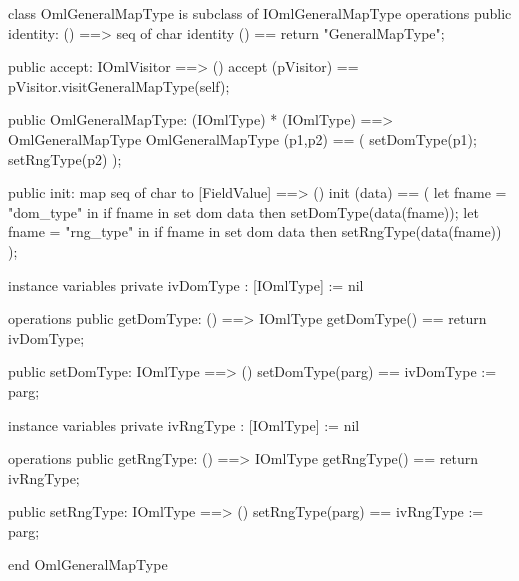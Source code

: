 \begin{vdm_al}
class OmlGeneralMapType is subclass of IOmlGeneralMapType
operations
  public identity: () ==> seq of char
  identity () == return "GeneralMapType";

  public accept: IOmlVisitor ==> ()
  accept (pVisitor) == pVisitor.visitGeneralMapType(self);

  public OmlGeneralMapType:
      (IOmlType) *
      (IOmlType) ==> OmlGeneralMapType
  OmlGeneralMapType (p1,p2) == 
   ( setDomType(p1);
     setRngType(p2) );

  public init: map seq of char to [FieldValue] ==> ()
  init (data) ==
    ( let fname = "dom_type" in
        if fname in set dom data
        then setDomType(data(fname));
      let fname = "rng_type" in
        if fname in set dom data
        then setRngType(data(fname)) );

instance variables
  private ivDomType : [IOmlType] := nil

operations
  public getDomType: () ==> IOmlType
  getDomType() == return ivDomType;

  public setDomType: IOmlType ==> ()
  setDomType(parg) == ivDomType := parg;

instance variables
  private ivRngType : [IOmlType] := nil

operations
  public getRngType: () ==> IOmlType
  getRngType() == return ivRngType;

  public setRngType: IOmlType ==> ()
  setRngType(parg) == ivRngType := parg;

end OmlGeneralMapType
\end{vdm_al}

